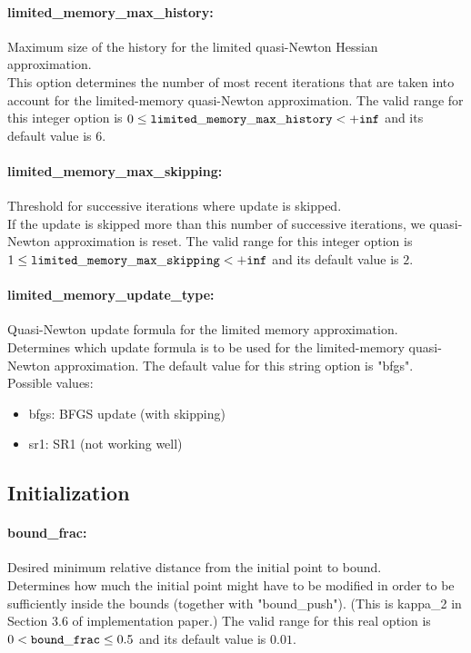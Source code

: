 \paragraph{limited\_memory\_max\_history:}\label{sec:limited_memory_max_history} Maximum size of the history for the limited quasi-Newton Hessian approximation. $\;$ \\
 This option determines the number of most recent
iterations that are taken into account for the
limited-memory quasi-Newton approximation. The valid range for this integer option is
$0 \le {\tt limited\_memory\_max\_history } <  {\tt +inf}$
and its default value is $6$.


\paragraph{limited\_memory\_max\_skipping:}\label{sec:limited_memory_max_skipping} Threshold for successive iterations where update is skipped. $\;$ \\
 If the update is skipped more than this number of
successive iterations, we quasi-Newton
approximation is reset. The valid range for this integer option is
$1 \le {\tt limited\_memory\_max\_skipping } <  {\tt +inf}$
and its default value is $2$.


\paragraph{limited\_memory\_update\_type:}\label{sec:limited_memory_update_type} Quasi-Newton update formula for the limited memory approximation. $\;$ \\
 Determines which update formula is to be used for
the limited-memory quasi-Newton approximation.
The default value for this string option is "bfgs".
\\ 
Possible values:
\begin{itemize}
   \item bfgs: BFGS update (with skipping)
   \item sr1: SR1 (not working well)
\end{itemize}

\subsection{Initialization}
\label{sec:Initialization}
\paragraph{bound\_frac:}\label{sec:bound_frac} Desired minimum relative distance from the initial point to bound. $\;$ \\
 Determines how much the initial point might have
to be modified in order to be sufficiently inside
the bounds (together with "bound\_push").  (This
is kappa\_2 in Section 3.6 of implementation
paper.) The valid range for this real option is 
$0 <  {\tt bound\_frac } \le 0.5$
and its default value is $0.01$.


